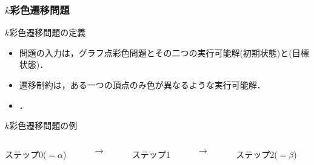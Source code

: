 \documentclass[dvipdfmx,11pt]{beamer}
\begin{document}
\begin{frame}\frametitle{$k$彩色遷移問題}

  \begin{block}{$k$彩色遷移問題の定義}
    \begin{itemize}
      \item 問題の入力は，グラフ点彩色問題とその二つの実行可能解\structure{$\alpha$}(初期状態)と\structure{$\beta$}(目標状態)．
      \item 遷移制約は，ある一つの頂点のみ色が異なるような実行可能解．
      \item {}．
    \end{itemize}
  \end{block}

  \begin{exampleblock}{$k$彩色遷移問題の例}
    \begin{columns}
      \begin{column}{0.3\textwidth}
        \centering
        
        ステップ0($=\alpha$)
      \end{column}
      \begin{column}{0.05\textwidth}
        \textbf{$\longrightarrow$}
      \end{column}
      \begin{column}[]{0.3\textwidth}
        \centering
        
        ステップ1
      \end{column}
      \begin{column}{0.05\textwidth}
        \textbf{$\longrightarrow$}
      \end{column}
      \begin{column}{0.3\textwidth}
        \centering
        
        ステップ2($=\beta$)
      \end{column}
    \end{columns}
  \end{exampleblock}
  
\end{frame}

\end{document}
